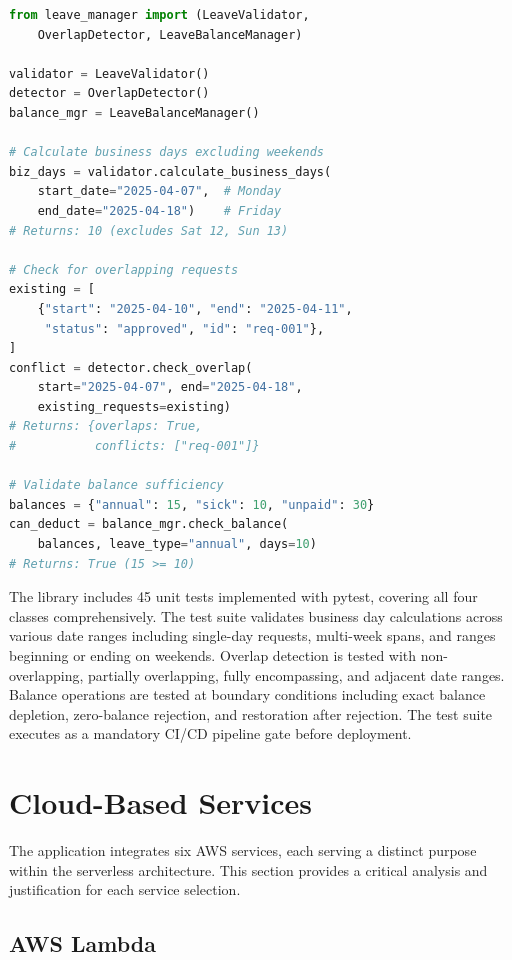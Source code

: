 \documentclass[conference]{IEEEtran}
\begin{document}
\begin{lstlisting}[language=Python, caption={LeaveValidator and OverlapDetector usage}]
from leave_manager import (LeaveValidator,
    OverlapDetector, LeaveBalanceManager)

validator = LeaveValidator()
detector = OverlapDetector()
balance_mgr = LeaveBalanceManager()

# Calculate business days excluding weekends
biz_days = validator.calculate_business_days(
    start_date="2025-04-07",  # Monday
    end_date="2025-04-18")    # Friday
# Returns: 10 (excludes Sat 12, Sun 13)

# Check for overlapping requests
existing = [
    {"start": "2025-04-10", "end": "2025-04-11",
     "status": "approved", "id": "req-001"},
]
conflict = detector.check_overlap(
    start="2025-04-07", end="2025-04-18",
    existing_requests=existing)
# Returns: {overlaps: True,
#           conflicts: ["req-001"]}

# Validate balance sufficiency
balances = {"annual": 15, "sick": 10, "unpaid": 30}
can_deduct = balance_mgr.check_balance(
    balances, leave_type="annual", days=10)
# Returns: True (15 >= 10)
\end{lstlisting}

The library includes 45 unit tests implemented with pytest, covering all four classes comprehensively. The test suite validates business day calculations across various date ranges including single-day requests, multi-week spans, and ranges beginning or ending on weekends. Overlap detection is tested with non-overlapping, partially overlapping, fully encompassing, and adjacent date ranges. Balance operations are tested at boundary conditions including exact balance depletion, zero-balance rejection, and restoration after rejection. The test suite executes as a mandatory CI/CD pipeline gate before deployment.

\section{Cloud-Based Services}

The application integrates six AWS services, each serving a distinct purpose within the serverless architecture. This section provides a critical analysis and justification for each service selection.

\subsection{AWS Lambda}
\end{document}
